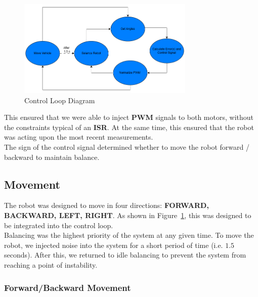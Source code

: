 \documentclass{article}
\begin{document}
\begin{figure}[H]
    \centering
    \includegraphics[width=0.75\textwidth]{Figures/Control_Loop_Diagram.png}
    \caption{Control Loop Diagram}
    \label{fig:control_loop_diagram}
\end{figure}

\begin{minipage}{\linewidth}
    This ensured that we were able to inject \textbf{PWM} signals to both motors, without the constraints typical of an \textbf{ISR}. At the same time,
    this ensured that the robot was acting upon the most recent measurements. \\

    The sign of the control signal determined whether to move the robot forward / backward to maintain balance.
\end{minipage}

\subsection{Movement}
\label{sec:movement}

\begin{minipage}{\linewidth}
    The robot was designed to move in four directions: \textbf{FORWARD, BACKWARD, LEFT, RIGHT}.
    As shown in Figure~\ref{fig:control_loop_diagram}, this was designed to be integrated into the control loop.  \\

    Balancing was the highest priority of the system at any given time. To move the robot, we injected noise into the system for a short period of time
    (i.e. $1.5$ seconds). After this, we returned to idle balancing to prevent the system from reaching a point of instability. \\
\end{minipage}

\subsubsection{Forward/Backward Movement}
\end{document}
